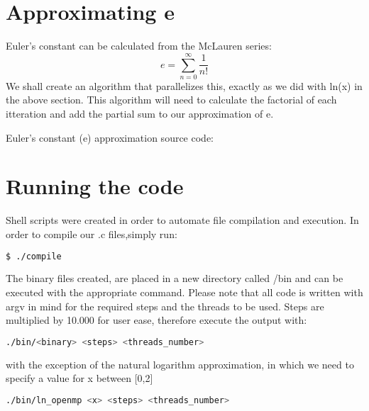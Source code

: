 \documentclass{article}
\begin{document}



\section{Approximating e}
Euler's constant can be calculated from the McLauren series:
\begin{equation}
	e = \sum_{n=0}^{\infty}\frac{1}{n!}
\end{equation}
We shall create an algorithm that parallelizes this, exactly as we did with ln(x) in the above section.
This algorithm will need to calculate the factorial of each itteration and add the partial sum to our approximation of e.
\begin{center}
	Euler's constant (e) approximation source code:
\end{center}



\newpage
\section*{Running the code} %

Shell scripts were created in order to automate file compilation and execution. In order to compile our .c files,simply run:
\begin{lstlisting}[language=bash]
	$ ./compile
\end{lstlisting}

The binary files created, are placed in a new directory called /bin and can be executed with the appropriate command. 
Please note that all code is written with argv in mind for the required steps and the threads to be used. Steps are multiplied by 10.000 for user ease, therefore execute the output with:
\begin{lstlisting}[language=bash]
	./bin/<binary> <steps> <threads_number>
\end{lstlisting}
with the exception of the natural logarithm approximation,
in which we need to specify a value for x between [0,2]
\begin{lstlisting}[language=bash]
	./bin/ln_openmp <x> <steps> <threads_number>
\end{lstlisting}
\end{document}
